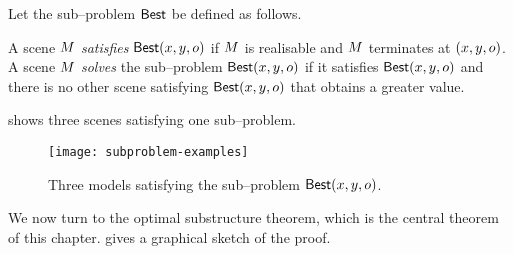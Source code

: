 \begin{definition}
  \label{def:sub-problem-in}
  Let the sub--problem $\SubProb$ be defined as follows.

  A scene $\Scene$ \textit{satisfies} $\SubProb(x,y,\WallOrient)$ if
  $\Scene$ is realisable and $\Scene$ terminates at $(x,y,\WallOrient)$.
  A scene $\Scene$ \textit{solves} the sub--problem
  $\SubProb(x,y,\WallOrient)$ if it satisfies
  $\SubProb(x,y,\WallOrient)$ and there is no other scene satisfying
  $\SubProb(x,y,\WallOrient)$ that obtains a greater value.
\end{definition}

 shows three scenes satisfying one
sub--problem.

\begin{figure}[tb]
  \centering
  \texttt{[image: subproblem-examples]}
  \caption{Three models satisfying the sub--problem
    $\SubProb(x,y,\WallOrient)$.}
  \label{fig:subproblem-examples}
\end{figure}

We now turn to the optimal substructure theorem, which is the central
theorem of this chapter.  gives a graphical
sketch of the proof.

